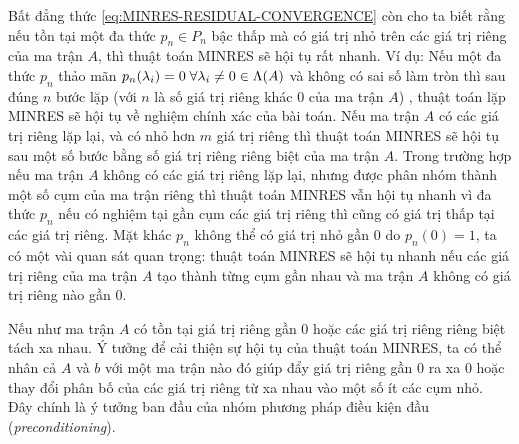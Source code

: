 \documentclass[14pt, a4paper]{article}
\numberwithin{equation}{section}
\numberwithin{algorithm}{section}
\numberwithin{figure}{section}
\numberwithin{dl}{section}
\numberwithin{md}{section}
\numberwithin{bd}{section}
\numberwithin{dn}{section}
\begin{document}
\begin{enumerate}[a)]
    Bất đẳng thức \ref{eq:MINRES-RESIDUAL-CONVERGENCE} còn cho ta biết rằng nếu tồn tại một đa thức $p_n \in P_n$ bậc thấp mà có giá trị nhỏ trên các giá trị riêng của ma trận $A$, thì thuật toán MINRES sẽ hội tụ rất nhanh. Ví dụ: Nếu một đa thức $p_n$ thảo mãn $p_n(\lambda_i)=0  \thickspace \forall \lambda_i \neq 0 \in \Lambda(A)$ và không có sai số làm tròn thì sau đúng $n$ bước lặp (với $n$ là số giá trị riêng khác 0 của ma trận $A$) , thuật toán lặp MINRES sẽ hội tụ về nghiệm chính xác của bài toán.
    Nếu ma trận $A$ có các giá trị riêng lặp lại, và có nhỏ hơn $m$ giá trị riêng thì thuật toán MINRES sẽ hội tụ sau một số bước bằng số giá trị riêng riêng biệt của ma trận $A$. Trong trường hợp nếu ma trận $A$ không có các giá trị riêng lặp lại, nhưng được phân nhóm thành một số cụm của ma trận riêng thì thuật toán MINRES vẫn hội tụ nhanh vì đa thức $p_n$ nếu có nghiệm tại gần cụm các giá trị riêng thì cũng có giá trị thấp tại các giá trị riêng.
    Mặt khác $p_n$ không thể có giá trị nhỏ gần $0$ do $p_n(0)=1$, ta có một vài quan sát quan trọng: thuật toán MINRES sẽ hội tụ nhanh nếu các giá trị riêng của ma trận $A$ tạo thành từng cụm gần nhau và ma trận $A$ không có giá trị riêng nào gần 0.

    Nếu như ma trận $A$ có tồn tại giá trị riêng gần 0 hoặc các giá trị riêng riêng biệt tách xa nhau. Ý tưởng để cải thiện sự hội tụ của thuật toán MINRES, ta có thể nhân cả $A$ và $b$ với một ma trận nào đó giúp đẩy giá trị riêng gần 0 ra xa 0 hoặc thay đổi phân bố của các giá trị riêng từ xa nhau vào một số ít các cụm nhỏ. Đây chính là ý tưởng ban đầu của nhóm phương pháp điều kiện đầu (\textit{preconditioning}).


\end{enumerate}
\end{document}
